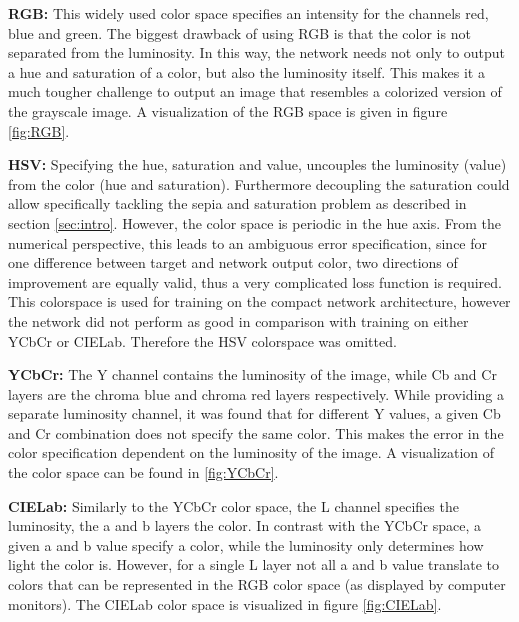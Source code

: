 
\textbf{RGB:} This widely used color space specifies an intensity for the channels red, blue and green. The biggest drawback of using RGB is that the color is not separated from the luminosity. In this way, the network needs not only to output a hue and saturation of a color, but also the luminosity itself. This makes it a much tougher challenge to output an image that resembles a colorized version of the grayscale image. A visualization of the RGB space is given in figure \ref{fig:RGB}.

\textbf{HSV:} Specifying the hue, saturation and value, uncouples the luminosity (value) from the color (hue and saturation). Furthermore decoupling the saturation could allow specifically tackling the sepia and saturation problem as described in section \ref{sec:intro}. However, the color space is periodic in the hue axis. From the numerical perspective, this leads to an ambiguous error specification, since for one difference between target and network output color, two directions of improvement are equally valid, thus a very complicated loss function is required. This colorspace is used for training on the compact network architecture, however the network did not perform as good in comparison with training on either YCbCr or CIELab. Therefore the HSV colorspace was omitted.

\textbf{YCbCr:} The Y channel contains the luminosity of the image, while Cb and Cr layers are the chroma blue and chroma red layers respectively. While providing a separate luminosity channel, it was found that for different Y values, a given Cb and Cr combination does not specify the same color. This makes the error in the color specification dependent on the luminosity of the image. A visualization of the color space can be found in \ref{fig:YCbCr}.

\textbf{CIELab:} Similarly to the YCbCr color space, the L channel specifies the luminosity, the a and b layers the color. In contrast with the YCbCr space, a given a and b value specify a color, while the luminosity only determines how light the color is. However, for a single L layer not all a and b value translate to colors that can be represented in the RGB color space (as displayed by computer monitors). The CIELab color space is visualized in figure \ref{fig:CIELab}.\\

